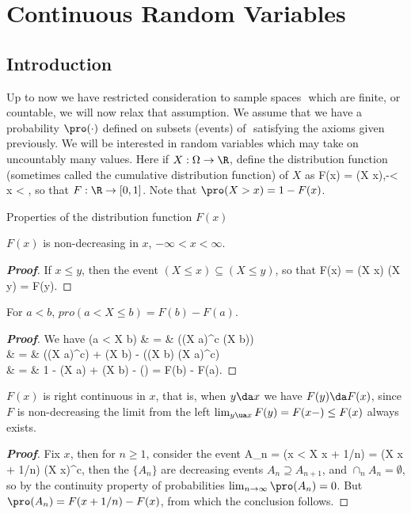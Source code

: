 \section{Continuous Random Variables}

\subsection{Introduction}

\begin{definition}
Up to now we have restricted consideration to sample spaces ­ which are finite, or countable, we will now relax that assumption. We assume that we have a probability $\pro(\cdot)$ defined on subsets (events) of ­ satisfying the axioms given previously. We will be interested in random variables which may take on uncountably many values. Here if $X : \Omega\to \R$, define the distribution function (sometimes called the cumulative distribution function) of $X$ as
\be
F(x) = \pro (X \leq x),\quad -\infty < x < \infty,
\ee
so that $F : \R \to [0, 1]$. Note that $\pro (X > x) = 1 - F(x)$.
\end{definition}

Properties of the distribution function $F(x)$
\ben
\item [1.] $F(x)$ is non-decreasing in $x$, $-\infty < x < \infty$.
\begin{proof}[\bf Proof]
If $x \leq y$, then the event $(X \leq x) \subseteq (X \leq y)$, so that
\be
F(x) = \pro (X \leq x) \leq \pro (X \leq y) = F(y).
\ee
\end{proof}


\item [2.] For $a < b$, $pro (a < X \leq b) = F(b) - F(a)$.
\begin{proof}[\bf Proof]
We have
\beast
\pro(a < X \leq b) & = & \pro ((X \leq a)^c \cap (X \leq b))\\
& = & \pro ((X \leq a)^c) + \pro (X \leq b) - \pro ((X \leq b) \cup (X \leq a)^c)\\
& = & 1 - \pro (X \leq a) + \pro (X \leq b) - \pro(\Omega­) = F(b) - F(a).
\eeast
\end{proof}

\item [3.] $F(x)$ is right continuous in $x$, that is, when $y \da x$ we have $F(y) \da F(x)$, since $F$ is non-decreasing the limit from the left $\lim_{y\ua x} F(y) = F(x-) \leq F(x)$ always exists.
\begin{proof}[\bf Proof]
Fix $x$, then for $n \geq 1$, consider the event
\be
A_n = (x < X \leq x + 1/n) = (X \leq x + 1/n) \cap (X \leq x)^c,
\ee
then the $\{A_n\}$ are decreasing events $A_n \supseteq A_{n+1}$, and $\cap_n A_n = \emptyset$, so by the continuity property of probabilities $\lim_{n\to \infty} \pro (A_n) = 0$. But $\pro(A_n) = F (x + 1/n) - F (x)$, from which the conclusion follows.
\end{proof}


